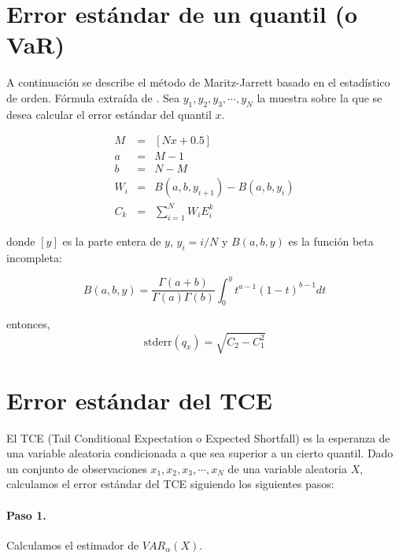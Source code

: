 
\section{Error est\'andar de un quantil (o VaR)}
\label{apendix:stderrvar}

A continuaci\'on se describe el m\'etodo de Maritz-Jarrett basado en el
estad\'istico de orden. F\'ormula extra\'ida de \cite{quant:algor}. Sea
$y_1, y_2, y_3, \cdots, y_N$ la muestra sobre la que se desea calcular 
el error est\'andar del quantil $x$.

\begin{eqnarray}
M   & = & [Nx + 0.5] \nonumber \\
a   & = & M - 1 \nonumber \\
b   & = & N - M \nonumber \\
W_i & = & B(a,b,y_{i+1}) - B(a,b,y_i) \nonumber \\
C_k & = & \sum_{i=1}^{N} W_i E_i^k \nonumber
\end{eqnarray}

donde $[y]$ es la parte entera de $y$, $y_i=i/N$ y $B(a,b,y)$ es la funci\'on
beta incompleta:

\begin{displaymath}
B(a,b,y)=\frac{\Gamma(a+b)}{\Gamma(a)\Gamma(b)}\int_0^y t^{a-1} (1-t)^{b-1} dt
\end{displaymath}

entonces,
\begin{displaymath}
\textrm{stderr}(q_x) = \sqrt{C_2 - C_1^2}
\end{displaymath}


\section{Error est\'andar del TCE}
\label{apendix:stderrtce}

El TCE (Tail Conditional Expectation o Expected Shortfall) es la esperanza
de una variable aleatoria condicionada a que sea superior a un cierto quantil.
Dado un conjunto de observaciones $x_1, x_2, x_3, \cdots, x_N$ de una variable
aleatoria $X$, calculamos el error est\'andar del TCE siguiendo los siguientes
pasos:

\paragraph{Paso 1.} Calculamos el estimador de $VAR_{\alpha}(X)$.

